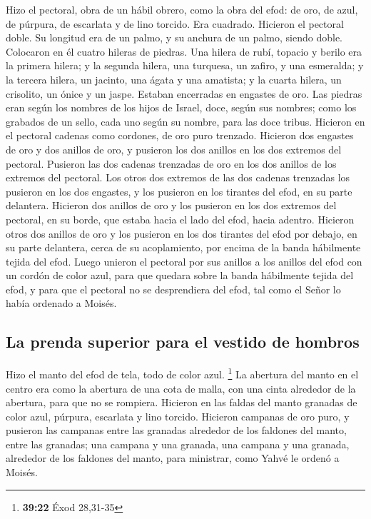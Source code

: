  Hizo el pectoral, obra de un hábil obrero, como la obra
del efod: de oro, de azul, de púrpura, de escarlata y de lino torcido.
 Era cuadrado. Hicieron el pectoral doble. Su longitud era
de un palmo, y su anchura de un palmo, siendo doble. 
Colocaron en él cuatro hileras de piedras. Una hilera de rubí, topacio y
berilo era la primera hilera;  y la segunda hilera, una
turquesa, un zafiro, y una esmeralda;  y la tercera
hilera, un jacinto, una ágata y una amatista;  y la
cuarta hilera, un crisolito, un ónice y un jaspe. Estaban encerradas en
engastes de oro.  Las piedras eran según los nombres de
los hijos de Israel, doce, según sus nombres; como los grabados de un
sello, cada uno según su nombre, para las doce tribus. 
Hicieron en el pectoral cadenas como cordones, de oro puro trenzado.
 Hicieron dos engastes de oro y dos anillos de oro, y
pusieron los dos anillos en los dos extremos del pectoral.
 Pusieron las dos cadenas trenzadas de oro en los dos
anillos de los extremos del pectoral.  Los otros dos
extremos de las dos cadenas trenzadas los pusieron en los dos engastes,
y los pusieron en los tirantes del efod, en su parte delantera.
 Hicieron dos anillos de oro y los pusieron en los dos
extremos del pectoral, en su borde, que estaba hacia el lado del efod,
hacia adentro.  Hicieron otros dos anillos de oro y los
pusieron en los dos tirantes del efod por debajo, en su parte delantera,
cerca de su acoplamiento, por encima de la banda hábilmente tejida del
efod.  Luego unieron el pectoral por sus anillos a los
anillos del efod con un cordón de color azul, para que quedara sobre la
banda hábilmente tejida del efod, y para que el pectoral no se
desprendiera del efod, tal como el Señor lo había ordenado a Moisés.

\hypertarget{la-prenda-superior-para-el-vestido-de-hombros-1}{%
\subsection{La prenda superior para el vestido de
hombros}\label{la-prenda-superior-para-el-vestido-de-hombros-1}}

 Hizo el manto del efod de tela, todo de color azul.
\footnote{\textbf{39:22} Éxod 28,31-35}  La abertura del
manto en el centro era como la abertura de una cota de malla, con una
cinta alrededor de la abertura, para que no se rompiera. 
Hicieron en las faldas del manto granadas de color azul, púrpura,
escarlata y lino torcido.  Hicieron campanas de oro puro,
y pusieron las campanas entre las granadas alrededor de los faldones del
manto, entre las granadas;  una campana y una granada,
una campana y una granada, alrededor de los faldones del manto, para
ministrar, como Yahvé le ordenó a Moisés.


